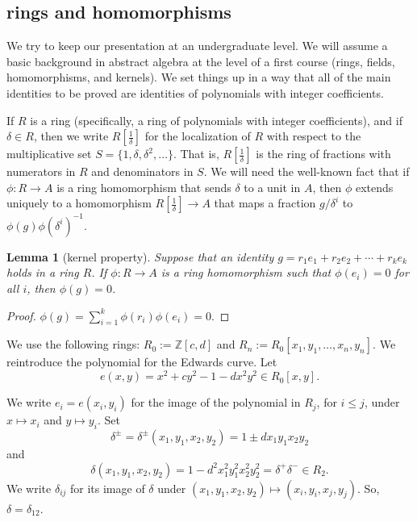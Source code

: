 \documentclass[12pt]{article}
\newtheorem{lemma}[theorem]{Lemma}
\newcommand{\ring}[1]{\mathbb{#1}}
\newcommand{\f}[1]{\frac{1}{#1}}
\begin{document}
\subsection{rings and homomorphisms}

We try to keep our presentation at an undergraduate level.  We will
assume a basic background in abstract algebra at the level of a first
course (rings, fields, homomorphisms, and kernels).  We set things up
in a way that all of the main identities to be proved are identities
of polynomials with integer coefficients.

If $R$ is a ring (specifically, a ring of polynomials with integer
coefficients), and if $\delta\in R$, then we write $R[\f{\delta}]$ for
the localization of $R$ with respect to the multiplicative set
$S=\{1,\delta,\delta^2,\ldots\}$.  That is, $R[\f{\delta}]$ is the
ring of fractions with numerators in $R$ and denominators in $S$.  We
will need the well-known fact that if $\phi:R\to A$ is a ring
homomorphism that sends $\delta$ to a unit in $A$, then $\phi$ extends
uniquely to a homomorphism $R[\f{\delta}]\to A$ that maps a fraction
$g/\delta^i$ to $\phi(g)\phi(\delta^i)^{-1}$.

\begin{lemma}[kernel property] Suppose that an identity $g = r_1 e_1 +
  r_2 e_2 +\cdots + r_k e_k$ holds in a ring $R$.  If $\phi:R\to A$ is
  a ring homomorphism such that $\phi(e_i) =0$ for all $i$, then
  $\phi(g)=0$.
\end{lemma}

\begin{proof}
$\phi(g) = \sum_{i=1}^k \phi(r_i) \phi(e_i) = 0.$
\end{proof}

We use the following rings: $R_0 := \ring{Z}[c,d]$ and $R_n :=
R_0[x_1,y_1,\ldots,x_n,y_n]$.  We reintroduce the polynomial for the
Edwards curve.  Let
\begin{equation}
e(x,y) = x^2 + c y^2 -1 - d x^2 y^2 \in  R_0[x,y].
\end{equation}



We write $e_i = e(x_i,y_i)$ for the image of the polynomial in $R_j$,
for $i\le j$, under $x\mapsto x_i$ and $y\mapsto y_i$.  Set
\[\delta^\pm=\delta^{\pm} (x_1,y_1,x_2,y_2) = 1\pm d x_1 y_1 x_2 y_2\] and
\[
\delta(x_1,y_1,x_2,y_2) = 1 - d^2 x_1^2 y_1^2 x_2^2 y_2^2 =\delta^+\delta^-\in R_2.
\]
We write $\delta_{ij}$ for its image of $\delta$ under
$(x_1,y_1,x_2,y_2)\mapsto (x_i,y_i,x_j,y_j)$.  So,
$\delta=\delta_{12}$.
\end{document}
